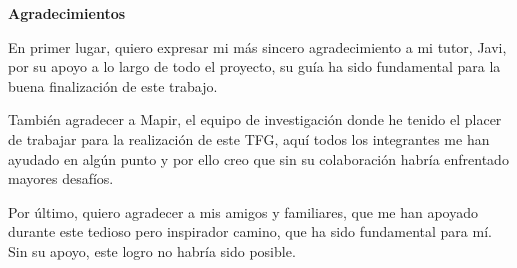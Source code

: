 \begin{center}
  \textbf{Agradecimientos}
\end{center}
\vspace{1cm}
En primer lugar, quiero expresar mi más sincero agradecimiento a mi tutor, Javi, por su apoyo a lo largo de todo el proyecto, su guía ha sido fundamental para la buena finalización de este trabajo.

También agradecer a Mapir, el equipo de investigación donde he tenido el placer de trabajar para la realización de este TFG, aquí todos los integrantes me han ayudado en algún punto y por ello creo que sin su colaboración habría enfrentado mayores desafíos.

Por último, quiero agradecer a mis amigos y familiares, que me han apoyado durante este tedioso pero inspirador camino, que ha sido fundamental para mí. Sin su apoyo, este logro no habría sido posible.

